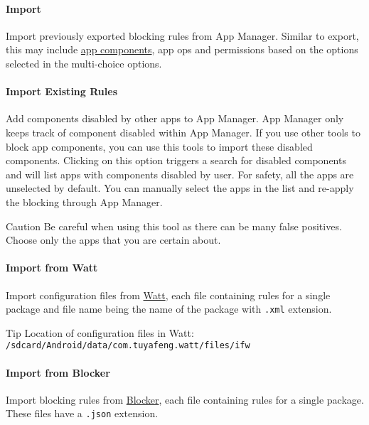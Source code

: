 \paragraph{Import} Import previously exported blocking rules from App Manager.
Similar to export, this may include \hyperref[subsec:faq:what-are-app-components]{app components}, app ops and
permissions based on the options selected in the multi-choice options.

\paragraph{Import Existing Rules}\label{par:import-existing-rules}
Add components disabled by other apps to App Manager.
App Manager only keeps track of component disabled within App Manager.
If you use other tools to block app components, you can use this tools to import these disabled components.
Clicking on this option triggers a search for disabled components and will list apps with components disabled by user.
For safety, all the apps are unselected by default.
You can manually select the apps in the list and re-apply the blocking through App Manager.

\begin{danger}{Caution}
    Be careful when using this tool as there can be many false positives.
    Choose only the apps that you are certain about.
\end{danger}

\paragraph{Import from Watt} Import configuration files from \href{https://github.com/tuyafeng/Watt}{Watt}, each file
containing rules for a single package and file name being the name of the package with \texttt{.xml} extension.

\begin{tip}{Tip}
    Location of configuration files in Watt: \texttt{/sdcard/Android/data/com.tuyafeng.watt/files/ifw}
\end{tip}

\paragraph{Import from Blocker} Import blocking rules from \href{https://github.com/lihenggui/blocker}{Blocker}, each
file containing rules for a single package.
These files have a \texttt{.json} extension.

